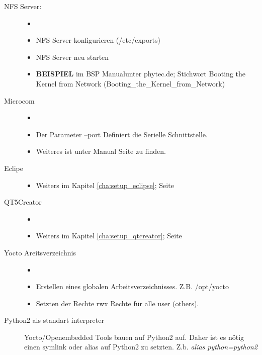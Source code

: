 \begin{description}
    \item[NFS Server:]
        \begin{itemize}
            \item[ ]
            \item NFS Server konfigurieren (/etc/exports)
            \item NFS Server neu starten
            \item \textbf{BEISPIEL} im \glqq BSP Manual\grqq unter  phytec.de;
                    Stichwort \glqq Booting the Kernel from Network\grqq
                (Booting\_the\_Kernel\_from\_Network)
        \end{itemize}
    \item[Microcom]
        \begin{itemize}
            \item[ ]
            \item Der Parameter --port Definiert die Serielle Schnittstelle.
            \item Weiteres ist unter Manual Seite zu finden.
        \end{itemize}
    \item[Eclipe]
        \begin{itemize}
            \item Weiters im Kapitel \ref{cha:setup_eclipse}; Seite
                \pageref{cha:setup_eclipse}
        \end{itemize}
    \item[QT5Creator]
        \begin{itemize}
            \item[ ]
            \item Weiters im Kapitel \ref{cha:setup_qtcreator}; Seite
                \pageref{cha:setup_qtcreator}
        \end{itemize}
    \item[Yocto Areitsverzeichnis]
        \begin{itemize}
            \item[ ]
            \item Erstellen eines globalen Arbeitsverzeichnisses.  Z.B.
                /opt/yocto \item Setzten der Rechte rwx Rechte für alle user
                (\glqq others\grqq).
        \end{itemize}
    \item[Python2 als standart interpreter] Yocto/Openembedded Tools bauen auf
        Python2 auf. Daher ist es nötig einen  symlink  oder alias
        auf Python2 zu setzten. Z.b. \textit{alias python=python2}

\end{description}
